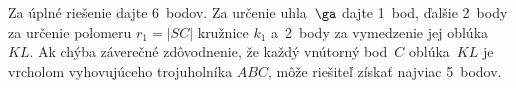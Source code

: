 {%

\nobreak\medskip\petit\noindent
Za úplné riešenie dajte 6~bodov. Za určenie uhla~$\ga$
dajte 1~bod, ďalšie 2~body za určenie polomeru $r_1=|SC|$
kružnice $k_1$ a~2~body za vymedzenie jej oblúka~$KL$.
Ak chýba záverečné zdôvodnenie, že každý vnútorný bod~$C$ oblúka~$KL$
je vrcholom vyhovujúceho trojuholníka $ABC$,
môže riešiteľ získať najviac 5~bodov.
\endpetit}


